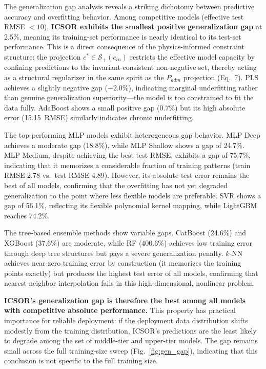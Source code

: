 \documentclass[11pt]{article}
\begin{document}
The generalization gap analysis reveals a striking dichotomy between predictive accuracy and overfitting behavior. Among competitive models (effective test RMSE $< 10$), \textbf{ICSOR exhibits the smallest positive generalization gap} at 2.5\%, meaning its training-set performance is nearly identical to its test-set performance. This is a direct consequence of the physics-informed constraint structure: the projection $c^* \in \mathcal{S}_+(c_{in})$ restricts the effective model capacity by confining predictions to the invariant-consistent non-negative set, thereby acting as a structural regularizer in the same spirit as the $P_{adm}$ projection (Eq.~7). PLS achieves a slightly negative gap ($-2.0\%$), indicating marginal underfitting rather than genuine generalization superiority---the model is too constrained to fit the data fully. AdaBoost shows a small positive gap (0.7\%) but its high absolute error (15.15~RMSE) similarly indicates chronic underfitting.

The top-performing MLP models exhibit heterogeneous gap behavior. MLP Deep achieves a moderate gap (18.8\%), while MLP Shallow shows a gap of 24.7\%. MLP Medium, despite achieving the best test RMSE, exhibits a gap of 75.7\%, indicating that it memorizes a considerable fraction of training patterns (train RMSE 2.78 vs.\ test RMSE 4.89). However, its absolute test error remains the best of all models, confirming that the overfitting has not yet degraded generalization to the point where less flexible models are preferable. SVR shows a gap of 56.1\%, reflecting its flexible polynomial kernel mapping, while LightGBM reaches 74.2\%.

The tree-based ensemble methods show variable gaps. CatBoost (24.6\%) and XGBoost (37.6\%) are moderate, while RF (400.6\%) achieves low training error through deep tree structures but pays a severe generalization penalty. $k$-NN achieves near-zero training error by construction (it memorizes the training points exactly) but produces the highest test error of all models, confirming that nearest-neighbor interpolation fails in this high-dimensional, nonlinear problem.

\textbf{ICSOR's generalization gap is therefore the best among all models with competitive absolute performance.} This property has practical importance for reliable deployment: if the deployment data distribution shifts modestly from the training distribution, ICSOR's predictions are the least likely to degrade among the set of middle-tier and upper-tier models. The gap remains small across the full training-size sweep (Fig.~\ref{fig:gen_gap}), indicating that this conclusion is not specific to the full training size.
\end{document}
